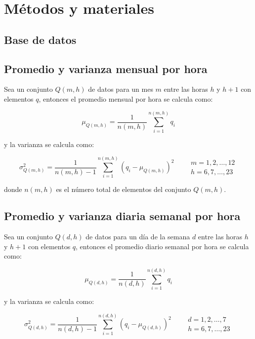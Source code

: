 \section{Métodos y materiales}

\subsection{Base de datos}

\subsection{Promedio y varianza mensual por hora}

Sea un conjunto $Q(m,h)$ de datos para un mes $m$  entre las horas $h$ y $h+1$ con elementos $q$, entonces el promedio mensual por hora se calcula como:

\begin{equation}
    \mu_{Q(m,h)} = \frac{1}{n(m,h)} \sum_{i=1}^{n(m,h)} q_i \label{eq:monthly_hourly_mean}
\end{equation}

y la varianza se calcula como:

\begin{equation}
    \sigma^2_{Q(m,h)} = \frac{1}{n(m,h)-1} \sum_{i=1}^{n(m,h)} (q_i - \mu_{Q(m,h)})^2 \qquad \begin{matrix}
        m=1,2,\dots,12 \\
        h=6,7,\dots,23
    \end{matrix} \label{eq:monthly_hourly_var}
\end{equation}

donde $n(m,h)$ es el número total de elementos del conjunto $Q(m,h)$.

\subsection{Promedio y varianza diaria semanal por hora}

Sea un conjunto $Q(d,h)$ de datos para un día de la semana $d$  entre las horas $h$ y $h+1$ con elementos $q$, entonces el promedio diario semanal por hora se calcula como:

\begin{equation}
    \mu_{Q(d,h)} = \frac{1}{n(d,h)} \sum_{i=1}^{n(d,h)} q_i \label{eq:daily_hourly_mean}
\end{equation}

y la varianza se calcula como:

\begin{equation}
    \sigma^2_{Q(d,h)} = \frac{1}{n(d,h)-1} \sum_{i=1}^{n(d,h)} (q_i - \mu_{Q(d,h)})^2 \qquad \begin{matrix}
        d=1,2,\dots,7 \\
        h=6,7,\dots,23
    \end{matrix} \label{eq:daily_hourly_var}
\end{equation}

